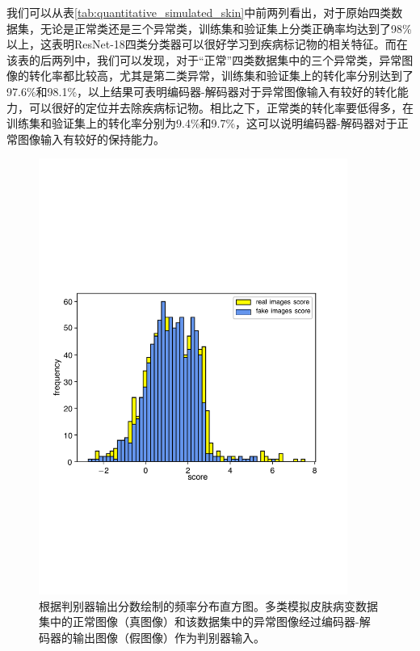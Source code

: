 我们可以从表\ref{tab:quantitative_simulated_skin}中前两列看出，对于原始四类数据集，无论是正常类还是三个异常类，训练集和验证集上分类正确率均达到了98\%以上，这表明ResNet-18四类分类器可以很好学习到疾病标记物的相关特征。而在该表的后两列中，我们可以发现，对于“正常”四类数据集中的三个异常类，异常图像的转化率都比较高，尤其是第二类异常，训练集和验证集上的转化率分别达到了97.6\%和98.1\%，以上结果可表明编码器-解码器对于异常图像输入有较好的转化能力，可以很好的定位并去除疾病标记物。相比之下，正常类的转化率要低得多，在训练集和验证集上的转化率分别为9.4\%和9.7\%，这可以说明编码器-解码器对于正常图像输入有较好的保持能力。
\begin{figure}[h]
	\centering
	\includegraphics[width=0.9\textwidth]{figure/simulated_skin_score_distribution.pdf}
	\caption[根据判别器输出分数绘制的频率分布直方图]{根据判别器输出分数绘制的频率分布直方图。多类模拟皮肤病变数据集中的正常图像（真图像）和该数据集中的异常图像经过编码器-解码器的输出图像（假图像）作为判别器输入。}
	\label{fig:simulated_skin_hist_freq}
\end{figure}

